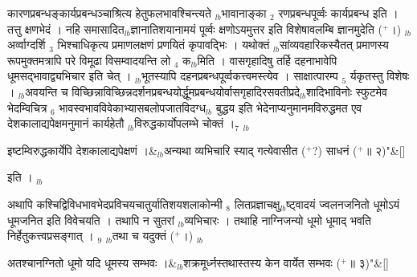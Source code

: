 \documentclass[article,12pt,a4paper]{memoir}%
\newcommand{\add}[1]{($^{+}$#1)}
\newcounter{parCount}
\begin{document}
कारणप्रबन्धङ्कार्यप्रबन्धञ्चाश्रित्य हेतुफलभावश्चिन्त्यते {\tiny $_{lb}$}भावानाङ्का {\tiny $_{2}$} रणप्रबन्धपूर्व्वः कार्यप्रबन्ध इति । तत्तु क्षणभेदं । नहि समासादित{\tiny $_{lb}$}ज्ञानातिशयानामयं पूर्व्वः क्षणोऽयमुत्तर इति विशेषावलम्बि ज्ञानमुदेति \add{।} {\tiny $_{lb}$}अर्व्वाग्दर्शि {\tiny $_{3}$} भिश्चाधिकृत्य प्रमाणलक्षणं प्रणयितं कृपावद्भिः । यथोक्तं {\tiny $_{lb}$}सांव्यवहारिकस्यैतत् प्रमाणस्य रूपमुक्तमत्रापि परे विमूढा विसम्वादयन्ति लो {\tiny $_{4}$} क{\tiny $_{lb}$}मिति । वासगृहादिषु तर्हि दहनाभावेपि धूमसद्भावाद्व्यभिचार इति चेत् । {\tiny $_{lb}$}भूतस्यापि दहनप्रबन्धपूर्व्वकत्त्वमस्त्येव । साक्षात्पारम्प {\tiny $_{5}$} र्यकृतस्तु विशेषः । {\tiny $_{lb}$}अवयन्ति च विच्छिन्नाविच्छिन्नदर्शनप्रबन्धयोर्द्धूमप्रबन्धयोर्वासगृहादिरसवतीप्रदे{\tiny $_{lb}$}शादिभाविनोः स्फुटमेव भेदम्विचित्र {\tiny $_{6}$} भावस्वभावविवेकाभ्यासबलोपजातविदग्ध{\tiny $_{lb}$} \leavevmode{} बुद्धय इति भेदेनाप्यनुमानमविरुद्धमत एव देशकालाद्यपेक्षमनुमानं कार्यहेतौ {\tiny $_{lb}$}विरुद्धकार्योपलम्भे चोक्तं ।{\tiny $_{7}$} {\tiny $_{lb}$} 
	    \pend%
	  
	    
	    \stanza[\smallbreak]
	  इष्टम्विरुद्धकार्येपि देशकालाद्यपेक्षणं ।&{\tiny $_{lb}$}अन्यथा व्यभिचारि स्याद् गत्येवासीत \add{?} साधनं \add{॥ २}{\normalfontlatin\large\qquad{}"}\&[\smallbreak]
	  
	  
	  
	    \pstart  \leavevmode%
	    \hphantom{.}
	   इति ।
	{}
	\pend%
      {\tiny $_{lb}$}

	  
	  \pstart \leavevmode%
	अथापि कश्चिद्विविधभावभेदप्रविचयचातुर्यातिशयशलाकोन्मी {\tiny $_{8}$} लितप्रज्ञाचक्षु{\tiny $_{lb}$}ष्ट्वादयं ज्वलनजनितो धूमोऽयं धूमजनित इति विवेचयति । तथापि न सुतरां {\tiny $_{lb}$}व्यभिचारः । तथाहि नाग्निजन्यो धूमो धूमाद् भवति निर्हेतुकत्त्वप्रसङ्गात् । {\tiny $_{9}$} \leavevmode{} {\tiny $_{lb}$}तथा च यदुक्तं \add{।} {\tiny $_{lb}$} 
	    \pend%
	  
	    
	    \stanza[\smallbreak]
	  अतश्चानग्नितो धूमो यदि धूमस्य सम्भवः ।&{\tiny $_{lb}$}शक्रमूर्ध्नस्तथास्तस्य केन वार्येत सम्भवः \add{॥ ३}{\normalfontlatin\large\qquad{}"}\&[\smallbreak]
	  
\end{document}
